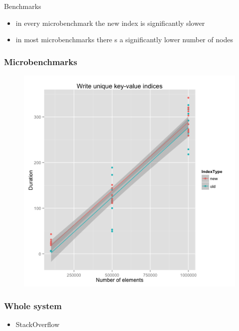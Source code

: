 \documentclass{beamer}
\begin{document}
\begin{section}{Benchmarks}
\begin{frame}
\begin{figure}
      \end{figure}
        \begin{itemize}
          \item in every microbenchmark the new index is significantly slower
          \item in most microbenchmarks there s a significantly lower number of nodes
        \end{itemize}
    \end{frame}

    \begin{frame}
      \frametitle{Microbenchmarks}
      \begin{figure}
        \includegraphics[scale=0.3]{images/nonUnique_random_write.png}
      \end{figure}
    \end{frame}

    \begin{frame}
      \frametitle{Whole system}
        \begin{itemize}
          \item StackOverflow
        \end{itemize}
    \end{frame}
  \end{section}
\end{document}
